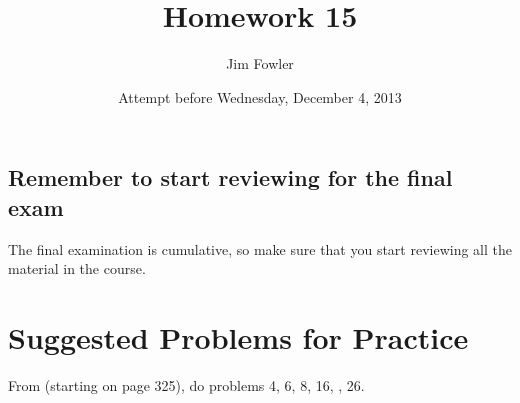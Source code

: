 \documentclass[12pt]{handout}
\title{Homework 15}
\date{Attempt before Wednesday, December  4, 2013}
\author{Jim Fowler}
\begin{document}
\maketitle







\subsection*{Remember to start reviewing for the final exam}
The final examination is cumulative, so make sure that you start reviewing all the material in the course.




\section*{Suggested Problems for Practice}

From  (starting on page 325),
do problems 4, 6, 8, 16, , 26.
\vspace{1ex}
\end{document}
